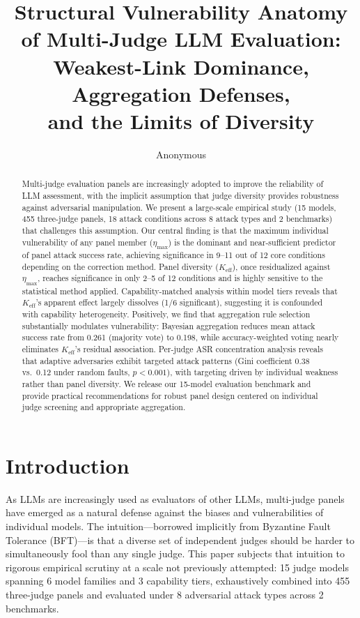 \documentclass[11pt,a4paper]{article}
\title{Structural Vulnerability Anatomy of Multi-Judge LLM Evaluation:\\Weakest-Link Dominance, Aggregation Defenses,\\and the Limits of Diversity}
\author{Anonymous}
\date{}
\begin{document}
\maketitle

\begin{abstract}
Multi-judge evaluation panels are increasingly adopted to improve the reliability of LLM assessment, with the implicit assumption that judge diversity provides robustness against adversarial manipulation.
We present a large-scale empirical study (15 models, 455 three-judge panels, 18 attack conditions across 8 attack types and 2 benchmarks) that challenges this assumption.
Our central finding is that the maximum individual vulnerability of any panel member ($\eta_{\max}$) is the dominant and near-sufficient predictor of panel attack success rate, achieving significance in 9--11 out of 12 core conditions depending on the correction method.
Panel diversity ($K_{\mathrm{eff}}$), once residualized against $\eta_{\max}$, reaches significance in only 2--5 of 12 conditions and is highly sensitive to the statistical method applied.
Capability-matched analysis within model tiers reveals that $K_{\mathrm{eff}}$'s apparent effect largely dissolves (1/6 significant), suggesting it is confounded with capability heterogeneity.
Positively, we find that aggregation rule selection substantially modulates vulnerability: Bayesian aggregation reduces mean attack success rate from 0.261 (majority vote) to 0.198, while accuracy-weighted voting nearly eliminates $K_{\mathrm{eff}}$'s residual association.
Per-judge ASR concentration analysis reveals that adaptive adversaries exhibit targeted attack patterns (Gini coefficient 0.38 vs.\ 0.12 under random faults, $p < 0.001$), with targeting driven by individual weakness rather than panel diversity.
We release our 15-model evaluation benchmark and provide practical recommendations for robust panel design centered on individual judge screening and appropriate aggregation.
\end{abstract}

\section{Introduction}
\label{sec:intro}

As LLMs are increasingly used as evaluators of other LLMs, multi-judge panels have emerged as a natural defense against the biases and vulnerabilities of individual models.
The intuition---borrowed implicitly from Byzantine Fault Tolerance (BFT)---is that a diverse set of independent judges should be harder to simultaneously fool than any single judge.
This paper subjects that intuition to rigorous empirical scrutiny at a scale not previously attempted: 15 judge models spanning 6 model families and 3 capability tiers, exhaustively combined into 455 three-judge panels and evaluated under 8 adversarial attack types across 2 benchmarks.
\end{document}

